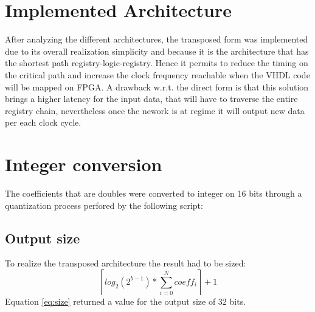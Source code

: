 \section{Implemented Architecture}
After analyzing the different architectures, the transposed form was implemented due to its overall realization simplicity and because it is the architecture that has the shortest path registry-logic-registry. Hence it permits to reduce the timing on the critical path and increase the clock frequency reachable when the VHDL code will be mapped on FPGA. A drawback w.r.t. the direct form is that this solution brings a higher latency for the input data, that will have to traverse the entire registry chain, nevertheless once the nework is at regime it will output new data per each clock cycle.
\section{Integer conversion}
The coefficients that are doubles were converted to integer on 16 bits through a quantization process perfored by the following script:

\subsection{Output size}
\label{sec:sizing}
To realize the transposed architecture the result had to be sized:
\begin{equation}
	\label{eq:size}
	\left \lceil log_2(2^{b-1})*\sum_{i=0}^{N} coeff_i\right \rceil	+1
\end{equation}
Equation \ref{eq:size} returned a value for the output size of 32 bits.
\clearpage